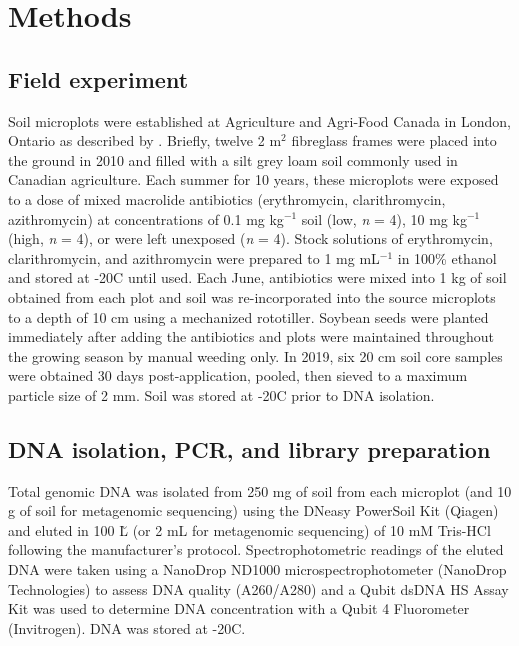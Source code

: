 \chapter{Methods}

\section{Field experiment}

Soil microplots were established at Agriculture and Agri-Food Canada in London, Ontario as described by \cite{Topp.2016}.
Briefly, twelve 2 m$^{2}$ fibreglass frames were placed into the ground in 2010 and filled with a silt grey loam soil commonly used in Canadian agriculture.
Each summer for 10 years, these microplots were exposed to a dose of mixed macrolide antibiotics (erythromycin, clarithromycin, azithromycin) at concentrations of 0.1 mg kg$^{-1}$ soil (low, \textit{n} = 4), 10 mg kg$^{-1}$ (high, \textit{n} = 4), or were left unexposed (\textit{n} = 4).
Stock solutions of erythromycin, clarithromycin, and azithromycin were prepared to 1 mg mL$^{-1}$ in 100\% ethanol and stored at -20\degree C until used.
Each June, antibiotics were mixed into 1 kg of soil obtained from each plot and soil was re-incorporated into the source microplots to a depth of 10 cm using a mechanized rototiller.
Soybean seeds were planted immediately after adding the antibiotics and plots were maintained throughout the growing season by manual weeding only.
In 2019, six 20 cm soil core samples were obtained 30 days post-application, pooled, then sieved to a maximum particle size of 2 mm. Soil was stored at -20\degree C prior to DNA isolation.

\section{DNA isolation, PCR, and library preparation}

Total genomic DNA was isolated from 250 mg of soil from each microplot (and 10 g of soil for metagenomic sequencing) using the DNeasy PowerSoil Kit (Qiagen) and eluted in 100 \u L (or 2 mL for metagenomic sequencing) of 10 mM Tris-HCl following the manufacturer’s protocol.
Spectrophotometric readings of the eluted DNA were taken using a NanoDrop ND1000 microspectrophotometer (NanoDrop Technologies) to assess DNA quality (A260/A280) and a Qubit\textsuperscript{\texttrademark{}} dsDNA HS Assay Kit was used to determine DNA concentration with a Qubit\textsuperscript{\texttrademark{}} 4 Fluorometer (Invitrogen).
DNA was stored at -20\degree C.

